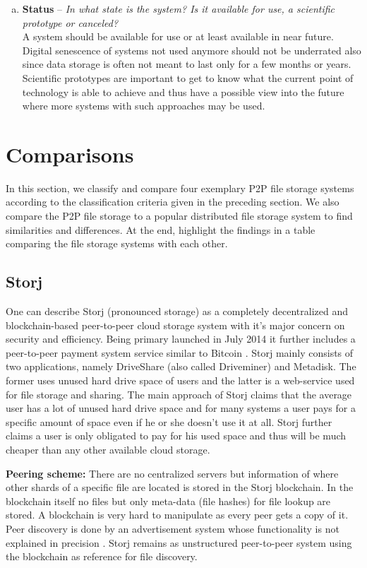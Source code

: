 \begin{enumerate}[(a)]
\item \textbf{Status} -- \textit{In what state is the system? Is it available for use, a scientific prototype or canceled?}\\
A system should be available for use or at least available in near future. Digital senescence of systems not used anymore should not be underrated also since data storage is often not meant to last only for a few months or years. Scientific prototypes are important to get to know what the current point of technology is able to achieve and thus have a possible view into the future where more systems with such approaches may be used.
\end{enumerate}

\section{Comparisons}
\label{comparisons}
In this section, we classify and compare four exemplary P2P file storage systems according to the classification criteria given in the preceding section. We also compare the P2P file storage to a popular distributed file storage system to find similarities and differences. At the end, highlight the findings in a table comparing the file storage systems with each other.

\subsection{Storj} %
One can describe Storj (pronounced storage) as a completely decentralized and blockchain-based peer-to-peer cloud storage system with it's major concern on security and efficiency. Being primary launched in July 2014 it further includes a peer-to-peer payment system service similar to Bitcoin \cite{storj:blog:what_is_storj}. Storj mainly consists of two applications, namely DriveShare (also called Driveminer) and Metadisk. The former uses unused hard drive space of users and the latter is a web-service used for file storage and sharing. The main approach of Storj claims that the average user has a lot of unused hard drive space and for many systems a user pays for a specific amount of space even if he or she doesn't use it at all. Storj further claims a user is only obligated to pay for his used space and thus will be much cheaper than any other available cloud storage.

\textbf{Peering scheme:} There are no centralized servers but information of where other shards of a specific file are located is stored in the Storj blockchain. In the blockchain itself no files but only meta-data (file hashes) for file lookup are stored. A blockchain is very hard to manipulate as every peer gets a copy of it. Peer discovery is done by an advertisement system whose functionality is not explained in precision \cite{storj:PDF}. Storj remains as unstructured peer-to-peer system using the blockchain as reference for file discovery.

